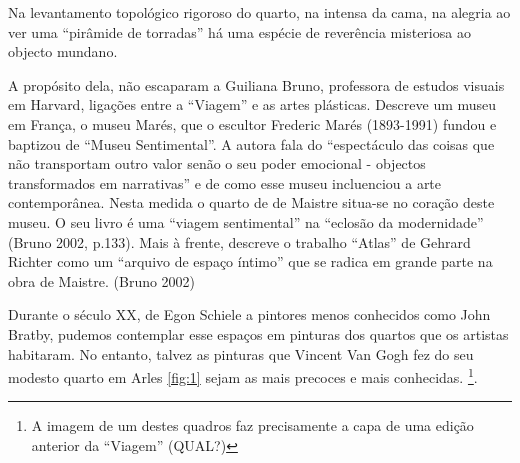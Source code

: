 \documentclass[12pt]{article}
\begin{document}
Na levantamento topológico rigoroso do quarto, na intensa da cama, na alegria ao ver uma ``pirâmide de torradas'' há uma espécie de reverência misteriosa ao objecto mundano.

A propósito dela, não escaparam a Guiliana Bruno, professora de estudos visuais em Harvard, ligações entre a ``Viagem'' e as artes plásticas. Descreve um museu em França, o museu Marés, que o escultor Frederic Marés (1893-1991) fundou e baptizou de ``Museu Sentimental''. A autora fala do ``espectáculo das coisas que não transportam outro valor senão o seu poder emocional - objectos transformados em narrativas'' e de como esse museu incluenciou a arte contemporânea. Nesta medida o quarto de de Maistre situa-se no coração deste museu. O seu livro é uma ``viagem sentimental'' na ``eclosão da modernidade'' (Bruno 2002, p.133). Mais à frente, descreve o trabalho ``Atlas'' de Gehrard Richter como um ``arquivo de espaço íntimo'' que se radica em grande parte na obra de Maistre. (Bruno 2002)

Durante o século XX, de Egon Schiele a pintores menos conhecidos como John Bratby, pudemos contemplar esse espaços em pinturas dos quartos que os artistas habitaram. No entanto, talvez as pinturas que Vincent Van Gogh fez do seu modesto quarto em Arles \ref{fig:1} sejam as mais precoces e mais conhecidas. \footnote{A imagem de um destes quadros faz precisamente a capa de uma edição anterior da ``Viagem'' (QUAL?)}.
\end{document}

